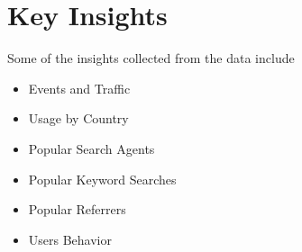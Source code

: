 \section{Key Insights} \label{keyinsights}

Some of the insights collected from the data include

\begin{itemize}
\item Events and Traffic
\item Usage by Country
\item Popular Search Agents
\item Popular Keyword Searches
\item Popular Referrers
\item Users Behavior
\end{itemize}
